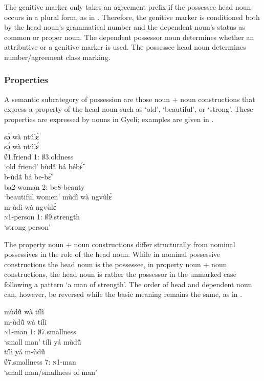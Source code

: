 The genitive marker only takes an agreement prefix if the possessee head noun occurs in a plural form, as in . Therefore, the genitive marker is conditioned both by the head noun's grammatical number and the dependent noun's status as common or proper noun. The dependent possessor noun determines whether an attributive or a genitive marker is used. The possessee head noun determines number/agreement class marking.


\subsubsection{Properties}  
\label{sec:PROP}

A semantic subcategory of possession are those noun + noun constructions that express a property of the head noun such as `old', `beautiful', or `strong'. These properties are expressed by nouns in Gyeli; examples are given in .

\ea\label{nposs}
\ea \label{nposs1}
  \glll     sɔ́ wà ntúlɛ́ \\
  sɔ́ wà ntúlɛ́ \\
               $\emptyset$1.friend 1:{\ATT} $\emptyset$3.oldness  \\
    \trans `old friend'
\ex \label{nposs2}
  \glll bùdã̂ bá bébɛ̃́  \\
  b-ùdã̂ bá be-bɛ̃́  \\
               ba2-woman 2:{\ATT} be8-beauty \\
    \trans `beautiful women'
\ex \label{nposs3}
  \glll    mùdì wà ngvùlɛ́ \\
  m-ùdì wà ngvùlɛ́ \\
               \textsc{n}1-person 1:{\ATT} $\emptyset$9.strength \\
    \trans `strong person'
\z
\z


The property noun + noun constructions differ structurally from nominal possessives in the role of the head noun. While in nominal possessive constructions the head noun is the possessee, in property noun + noun constructions, the head noun is rather the possessor in the unmarked case following a pattern `a man of strength'. The order of head and dependent noun can, however, be reversed while the basic meaning remains the same, as in .

\ea\label{tili}
\ea \label{tili1}
  \glll  mùdũ̂ wà tílì \\
  m-ùdũ̂ wà tílì \\
               \textsc{n}1-man 1:{\ATT} $\emptyset$7.smallness \\
    \trans `small man'
\ex \label{tili2}
  \glll      tílì yá mùdũ̂ \\
 tílì yá m-ùdũ̂ \\
              $\emptyset$7.smallness 7:{\ATT} \textsc{n}1-man  \\
    \trans `small man/smallness of man'
\z
\z


